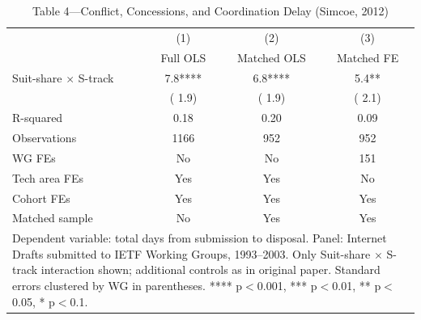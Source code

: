 \begin{table}[htbp]\centering
\def\sym#1{\ifmmode^{#1}\else\(^{#1}\)\fi}
\caption{Table 4---Conflict, Concessions, and Coordination Delay (Simcoe, 2012)}
\begin{tabular}{l*{3}{c}}
\toprule
            &\multicolumn{1}{c}{(1)}&\multicolumn{1}{c}{(2)}&\multicolumn{1}{c}{(3)}\\
            &  Full OLS  & Matched OLS & Matched FE \\
\midrule
Suit-share $\times$ S-track &      7.8**** &      6.8**** &      5.4** \\
            &  (     1.9)  &  (     1.9)  &  (     2.1)  \\
\midrule
R-squared   &  0.18 &  0.20 &  0.09 \\
Observations& 1166 & 952 & 952 \\
WG FEs      &  No  &  No  & 151 \\
Tech area FEs& Yes & Yes  &  No  \\
Cohort FEs  & Yes  & Yes  & Yes  \\
Matched sample& No & Yes  & Yes  \\
\bottomrule
\multicolumn{4}{p{0.9\textwidth}}{\footnotesize 
Dependent variable: total days from submission to disposal. 
Panel: Internet Drafts submitted to IETF Working Groups, 1993--2003. 
Only Suit-share $\times$ S-track interaction shown; 
additional controls as in original paper. 
Standard errors clustered by WG in parentheses. 
**** p$<$0.001, *** p$<$0.01, ** p$<$0.05, * p$<$0.1.}\\
\end{tabular}
\end{table}
